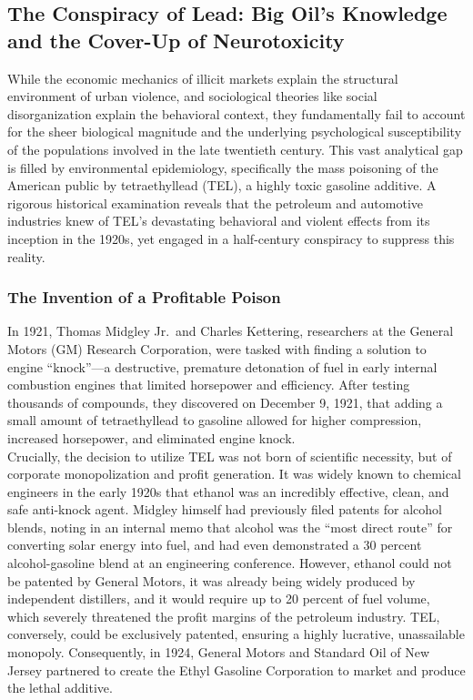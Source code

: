 \documentclass[
]{article}
\begin{document}
\subsection{\texorpdfstring{\textbf{The Conspiracy of Lead: Big Oil's
Knowledge and the Cover-Up of
Neurotoxicity}}{The Conspiracy of Lead: Big Oil's Knowledge and the Cover-Up of Neurotoxicity}}\label{the-conspiracy-of-lead-big-oils-knowledge-and-the-cover-up-of-neurotoxicity}

While the economic mechanics of illicit markets explain the structural
environment of urban violence, and sociological theories like social
disorganization explain the behavioral context, they fundamentally fail
to account for the sheer biological magnitude and the underlying
psychological susceptibility of the populations involved in the late
twentieth century. This vast analytical gap is filled by environmental
epidemiology, specifically the mass poisoning of the American public by
tetraethyllead (TEL), a highly toxic gasoline additive. A rigorous
historical examination reveals that the petroleum and automotive
industries knew of TEL's devastating behavioral and violent effects from
its inception in the 1920s, yet engaged in a half-century conspiracy to
suppress this reality.

\subsubsection{\texorpdfstring{\textbf{The Invention of a Profitable
Poison}}{The Invention of a Profitable Poison}}\label{the-invention-of-a-profitable-poison}

In 1921, Thomas Midgley Jr.~and Charles Kettering, researchers at the
General Motors (GM) Research Corporation, were tasked with finding a
solution to engine ``knock''---a destructive, premature detonation of
fuel in early internal combustion engines that limited horsepower and
efficiency. After testing thousands of compounds, they discovered on
December 9, 1921, that adding a small amount of tetraethyllead to
gasoline allowed for higher compression, increased horsepower, and
eliminated engine knock.\\
Crucially, the decision to utilize TEL was not born of scientific
necessity, but of corporate monopolization and profit generation. It was
widely known to chemical engineers in the early 1920s that ethanol was
an incredibly effective, clean, and safe anti-knock agent. Midgley
himself had previously filed patents for alcohol blends, noting in an
internal memo that alcohol was the ``most direct route'' for converting
solar energy into fuel, and had even demonstrated a 30 percent
alcohol-gasoline blend at an engineering conference. However, ethanol
could not be patented by General Motors, it was already being widely
produced by independent distillers, and it would require up to 20
percent of fuel volume, which severely threatened the profit margins of
the petroleum industry. TEL, conversely, could be exclusively patented,
ensuring a highly lucrative, unassailable monopoly. Consequently, in
1924, General Motors and Standard Oil of New Jersey partnered to create
the Ethyl Gasoline Corporation to market and produce the lethal
additive.
\end{document}
